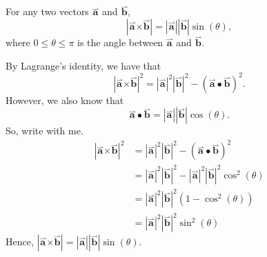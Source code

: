 \documentclass{ximera}
\begin{document}
\begin{theorem}
  For any two vectors $\overset{\boldsymbol{\rightharpoonup}}{\mathbf{a}}$ and $\overset{\boldsymbol{\rightharpoonup}}{\mathbf{b}}$,
  \[
  |\overset{\boldsymbol{\rightharpoonup}}{\mathbf{a}} \boldsymbol\times \overset{\boldsymbol{\rightharpoonup}}{\mathbf{b}}| = |\overset{\boldsymbol{\rightharpoonup}}{\mathbf{a}}||\overset{\boldsymbol{\rightharpoonup}}{\mathbf{b}}|\sin(\theta),
  \]
  where $0\le \theta\le\pi$ is the angle between $\overset{\boldsymbol{\rightharpoonup}}{\mathbf{a}}$ and
  $\overset{\boldsymbol{\rightharpoonup}}{\mathbf{b}}$.
  \begin{explanation}
    By Lagrange's identity, we have that
    \[
    |\overset{\boldsymbol{\rightharpoonup}}{\mathbf{a}} \boldsymbol\times \overset{\boldsymbol{\rightharpoonup}}{\mathbf{b}}|^2 = |\overset{\boldsymbol{\rightharpoonup}}{\mathbf{a}}|^2 |\overset{\boldsymbol{\rightharpoonup}}{\mathbf{b}}|^2 - (\overset{\boldsymbol{\rightharpoonup}}{\mathbf{a}} \bullet \overset{\boldsymbol{\rightharpoonup}}{\mathbf{b}})^2.
    \]
    However, we also know that
    \[
    \overset{\boldsymbol{\rightharpoonup}}{\mathbf{a}} \bullet \overset{\boldsymbol{\rightharpoonup}}{\mathbf{b}} = |\overset{\boldsymbol{\rightharpoonup}}{\mathbf{a}}| |\overset{\boldsymbol{\rightharpoonup}}{\mathbf{b}}|\cos(\theta).
    \]
    So, write with me.
    \begin{align*}
      |\overset{\boldsymbol{\rightharpoonup}}{\mathbf{a}} \boldsymbol\times \overset{\boldsymbol{\rightharpoonup}}{\mathbf{b}}|^2 &= |\overset{\boldsymbol{\rightharpoonup}}{\mathbf{a}}|^2 |\overset{\boldsymbol{\rightharpoonup}}{\mathbf{b}}|^2 - (\overset{\boldsymbol{\rightharpoonup}}{\mathbf{a}} \bullet \overset{\boldsymbol{\rightharpoonup}}{\mathbf{b}})^2\\
      &= |\overset{\boldsymbol{\rightharpoonup}}{\mathbf{a}}|^2 |\overset{\boldsymbol{\rightharpoonup}}{\mathbf{b}}|^2 - |\overset{\boldsymbol{\rightharpoonup}}{\mathbf{a}}|^2 |\overset{\boldsymbol{\rightharpoonup}}{\mathbf{b}}|^2\cos^2(\theta)\\
      &= |\overset{\boldsymbol{\rightharpoonup}}{\mathbf{a}}|^2 |\overset{\boldsymbol{\rightharpoonup}}{\mathbf{b}}|^2(1 - \cos^2(\theta))\\
      &= |\overset{\boldsymbol{\rightharpoonup}}{\mathbf{a}}|^2 |\overset{\boldsymbol{\rightharpoonup}}{\mathbf{b}}|^2\sin^2(\theta)
    \end{align*}
    Hence, $|\overset{\boldsymbol{\rightharpoonup}}{\mathbf{a}} \boldsymbol\times \overset{\boldsymbol{\rightharpoonup}}{\mathbf{b}}| = |\overset{\boldsymbol{\rightharpoonup}}{\mathbf{a}}||\overset{\boldsymbol{\rightharpoonup}}{\mathbf{b}}|\sin(\theta)$.
  \end{explanation}
\end{theorem}
\end{document}
